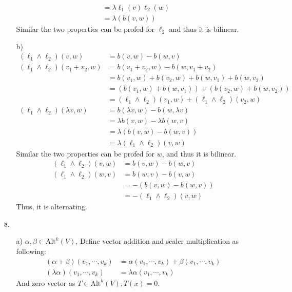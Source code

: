 \documentclass{article}
\begin{document}
\begin{itemize}
\begin{itemize}
\begin{align*}
            &=\lambda \ell_1(v)\ell_2(w)\\
            &=\lambda(b(v,w))
        \end{align*}
        Similar the two properties can be profed for \(\ell_2\) and thus it is bilinear.
        \item [b)]
        \begin{align*}
        (\ell_1 \wedge  \ell_2)(v,w)&=b(v,w)-b(w,v)\\
        (\ell_1 \wedge  \ell_2)(v_1+v_2,w)&=b(v_1+v_2,w)-b(w,v_1+v_2)\\
        &=b(v_1,w)+b(v_2,w)+b(w,v_1)+b(w,v_2)\\
        &=(b(v_1,w)+b(w,v_1))+(b(v_2,w)+b(w,v_2))\\
        &=(\ell_1\wedge \ell_2)(v_1,w)+(\ell_1\wedge \ell_2)(v_2,w)\\
        (\ell_1\wedge \ell_2)(\lambda v,w)&=b(\lambda v,w)-b(w,\lambda v)\\
        &=\lambda b( v,w)-\lambda b(w, v)\\
        &=\lambda (b(v,w)-b(w,v))\\
        &=\lambda (\ell_1\wedge \ell_2)(v,w)
        \end{align*}
        Similar the two properties can be profed for \(w\), and thus it is bilinear.\\
        \begin{align*}
            (\ell_1 \wedge  \ell_2)(v,w)&=b(v,w)-b(w,v)\\
            (\ell_1 \wedge  \ell_2)(w,v)&=b(w,v)-b(v,w)\\
            &=-(b(v,w)-b(w,v))\\
            &=-(\ell_1 \wedge  \ell_2)(v,w)
        \end{align*}
        Thus, it is alternating.
    \end{itemize}
    \item [8.]
    \begin{itemize}
        \item [a)] \(\alpha,\beta \in \text{Alt}^k(V)\), Define vector addition and scaler multiplication as following:
        \begin{align*}
            (\alpha+\beta)(v_1,\cdots,v_k)&=\alpha(v_1,\cdots,v_k)+\beta(v_1,\cdots,v_k)\\
            (\lambda \alpha)(v_1,\cdots,v_k)&=\lambda \alpha(v_1,\cdots,v_k)
        \end{align*}
        And zero vector as \(T\in \text{Alt}^k(V), T(x)=0\).
        \begin{align*}

\end{align*}
\end{itemize}
\end{itemize}
\end{document}
